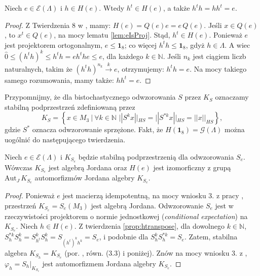 {\begin{Theorem}
\label{prop:htranspose}
Niech $e \in \mathcal{E}(\Lambda)$ i $h \in H(e)$.
Wtedy $h^{t} \in H(e)$, a także $h^{t} h = h h^{t} = e$.
\end{Theorem}
\begin{proof}
    Z Twierdzenia 8  w \cite{schwarz1955hausdorff}, mamy:
    $H(e) = Q(e) e = e \, Q(e)$.
Jeśli $x \in Q(e)$, to $x^{t} \in Q(e)$,
na mocy lematu \ref{lem:eIsProj}.
Stąd, $h^{t} \in H(e)$.
Ponieważ $e$ jest projektorem ortogonalnym, $e \leq \mathbf{1}_{8}$;
co więcej $h^{t} h \leq \mathbf{1}_{8}$, gdyż $h \in \Lambda$.
A wiec $\hat{0} \leq (h^{t} h)^{k} \leq h^{t} h = e h^{t} h e \leq e$,
dla każdego $k \in \mathbb{N}$.
Jeśli $n_{k}$ jest ciągiem liczb naturalnych, takim że
    $(h^{t} h)^{n_{k}} \overset{k}{\rightarrow} e$,
otrzymujemy: $h^{t} h = e$.
Na mocy takiego samego rozumowania, mamy także: $h h^{t} = e$.
\end{proof}

Przypomnijmy, że dla  bistochastycznego odwzorowania $S$
przez $K_{S}$ oznaczamy stabilną podprzestrzeń zdefiniowaną przez
\begin{equation}
    K_{S} = \left \{ x \in M_{3} \:|\:
            \forall k \in \mathbb{N} \,\,
            || S^{k} x ||_{HS} = || S^{*k} x ||_{HS} =  ||x||_{HS}
    \right \},
\end{equation}
gdzie $S^{*}$ oznacza odwzorowanie sprzężone.
Fakt, że $H(\mathbf{1}_{8}) = \mathcal{G}(\Lambda)$
można uogólnić do następującego twierdzenia.
\begin{Theorem}
    Niech $e \in \mathcal{E}(\Lambda)$ i
    $K_{S_{e}}$ będzie stabilną podprzestrzenią dla odwzorowania $S_{e}$.
    Wówczas $K_{S_{e}}$ jest algebrą Jordana oraz
    $H(e)$ jest izomorficzny z grupą $\text{Aut}_{J} \, K_{S_{e}}$
    automorfizmów Jordana algebry $K_{S_{e}}$.
\end{Theorem}

\begin{proof}
    Ponieważ $e$ jest macierzą idempotentną, na mocy
    wniosku 3. z pracy \cite{miller2015stable},
    przestrzeń $K_{S_{e}} = S_{e}(M_{3})$ jest algebrą Jordana.
    Odwzorowanie $S_{e}$ jest w rzeczywistości
    projektorem o normie jednostkowej (\emph{conditional expectation})
    na $K_{S_{e}}$.
    Niech $h \in H(e)$.
    Z twierdzenia \ref{prop:htranspose}, dla dowolnego $k\in \mathbb{N}$,
    $S_{h}^{* k} S_{h}^{k} = S_{h^{t}}^{k} S_{h}^{k} =  S_{(h^{t})^{k} h^{k}} = S_{e}$,
    i podobnie dla $S_{h}^{k} S_{h}^{* k}= S_{e}$.
    Zatem, stabilna algebra $K_{S_{h}} = K_{S_{e}}$
    (por. \cite{miller2015stable}, równ. (3.3) i poniżej).
    Znów na mocy wniosku 3. z \cite{miller2015stable},
    $\varphi_{h} = S_{h} \big |_{K_{S_{e}}}$
    jest automorfizmem Jordana algebry $K_{S_{e}}$.


\end{proof}}
